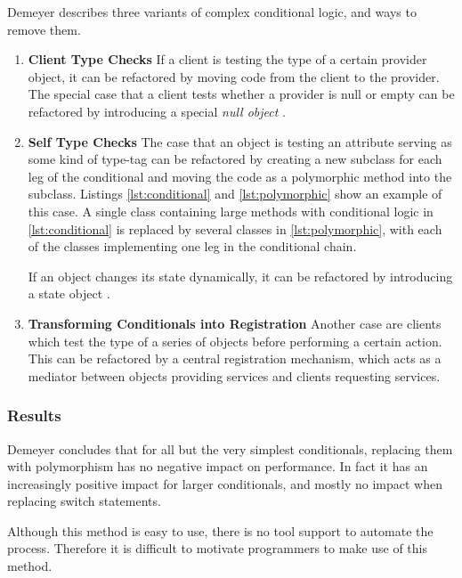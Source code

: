 \documentclass[conference,compsoc,a4paper]{IEEEtran}
\newcommand{\code}[1]{{\small\ttfamily #1}}
\begin{document}
Demeyer describes three variants of complex conditional logic, and ways to remove them.

\begin{enumerate}
  \item \textbf{Client Type Checks}
  If a client is testing the type of a certain provider object, it can be refactored by moving code from the client to 
  the provider. The special case that a client tests whether a provider is \code{null} or empty can be refactored by 
  introducing a special \emph{null object} \cite{nullobject}.
  
  \item \textbf{Self Type Checks}
  The case that an object is testing an attribute serving as some kind of type-tag can be refactored by creating a new 
  subclass for each leg of the conditional and moving the code as a polymorphic method into the subclass. Listings 
  \ref{lst:conditional} and \ref{lst:polymorphic} show an example of this case. A single class containing large methods 
  with conditional logic in \autoref{lst:conditional} is replaced by several classes in \autoref{lst:polymorphic}, with 
  each of the classes implementing one leg in the conditional chain.
  
  If an object changes its state dynamically, it can be refactored by introducing a state object   
  \cite[pp.~305--313]{designpatterns}.
  
  \item \textbf{Transforming Conditionals into Registration}
  Another case are clients which test the type of a series of objects before performing a certain action. This can be 
  refactored by a central registration mechanism, which acts as a mediator between objects providing services and 
  clients requesting services.
\end{enumerate}

\subsubsection{Results}

Demeyer concludes that for all but the very simplest conditionals, replacing them with polymorphism has no negative 
impact on performance. In fact it has an increasingly positive impact for larger conditionals, and mostly no impact 
when replacing \code{switch} statements.

Although this method is easy to use, there is no tool support to automate the process. Therefore it is difficult to 
motivate programmers to make use of this method.
\end{document}
